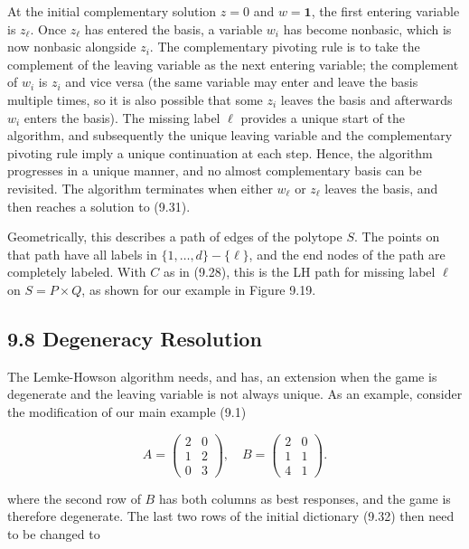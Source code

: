 \documentclass[12pt]{article}
\begin{document}
At the initial complementary solution $z=0$ and $w=\mathbf{1}$, the first entering variable is $z_{\ell}$. Once $z_{\ell}$ has entered the basis, a variable $w_{i}$ has become nonbasic, which is now nonbasic alongside $z_{i}$. The complementary pivoting rule is to take the\\
complement of the leaving variable as the next entering variable; the complement of $w_{i}$ is $z_{i}$ and vice versa (the same variable may enter and leave the basis multiple times, so it is also possible that some $z_{i}$ leaves the basis and afterwards $w_{i}$ enters the basis). The missing label $\ell$ provides a unique start of the algorithm, and subsequently the unique leaving variable and the complementary pivoting rule imply a unique continuation at each step. Hence, the algorithm progresses in a unique manner, and no almost complementary basis can be revisited. The algorithm terminates when either $w_{\ell}$ or $z_{\ell}$ leaves the basis, and then reaches a solution to (9.31).

Geometrically, this describes a path of edges of the polytope $S$. The points on that path have all labels in $\{1, \ldots, d\}-\{\ell\}$, and the end nodes of the path are completely labeled. With $C$ as in (9.28), this is the LH path for missing label $\ell$ on $S=P \times Q$, as shown for our example in Figure 9.19.

\subsection*{9.8 Degeneracy Resolution}
The Lemke-Howson algorithm needs, and has, an extension when the game is degenerate and the leaving variable is not always unique. As an example, consider the modification of our main example (9.1)

\[
A=\left(\begin{array}{ll}
2 & 0  \tag{9.39}\\
1 & 2 \\
0 & 3
\end{array}\right), \quad B=\left(\begin{array}{ll}
2 & 0 \\
1 & 1 \\
4 & 1
\end{array}\right) .
\]

where the second row of $B$ has both columns as best responses, and the game is therefore degenerate. The last two rows of the initial dictionary (9.32) then need to be changed to
\end{document}

